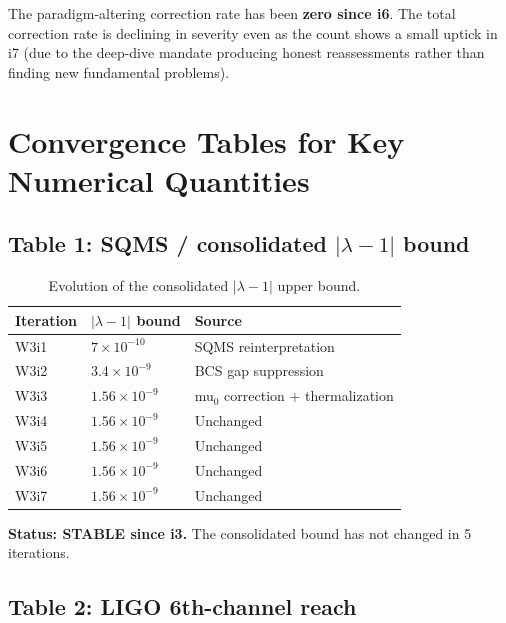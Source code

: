 \documentclass[11pt]{article}
\newcommand{\ee}[1]{\times 10^{#1}}
\newcommand{\lbone}{|\lambda - 1|}
\begin{document}
The paradigm-altering correction rate has been \textbf{zero since i6}.
The total correction rate is declining in severity even as the count
shows a small uptick in i7 (due to the deep-dive mandate producing
honest reassessments rather than finding new fundamental problems).


\section{Convergence Tables for Key Numerical Quantities}
\label{sec:convergence-tables}

\subsection{Table 1: SQMS / consolidated $\lbone$ bound}

\begin{table}[H]
\centering
\caption{Evolution of the consolidated $\lbone$ upper bound.}
\label{tab:lambda-bound}
\begin{tabular}{lll}
\toprule
\textbf{Iteration} & $\lbone$ \textbf{bound} & \textbf{Source} \\
\midrule
W3i1 & $7\ee{-10}$ & SQMS reinterpretation \\
W3i2 & $3.4\ee{-9}$ & BCS gap suppression \\
W3i3 & $1.56\ee{-9}$ & mu$_0$ correction + thermalization \\
W3i4 & $1.56\ee{-9}$ & Unchanged \\
W3i5 & $1.56\ee{-9}$ & Unchanged \\
W3i6 & $1.56\ee{-9}$ & Unchanged \\
W3i7 & $1.56\ee{-9}$ & Unchanged \\
\bottomrule
\end{tabular}
\end{table}

\textbf{Status: STABLE since i3.} The consolidated bound has not changed
in 5 iterations.

\subsection{Table 2: LIGO 6th-channel reach}
\end{document}
